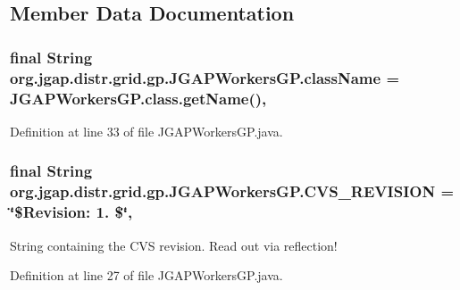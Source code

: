 \subsection{Member Data Documentation}
\hypertarget{classorg_1_1jgap_1_1distr_1_1grid_1_1gp_1_1_j_g_a_p_workers_g_p_a0b24b4c9ff9c7b9b4c87e965b9c81a77}{
\subsubsection[{class\-Name}]{\setlength{\rightskip}{0pt plus 5cm}final String org.\-jgap.\-distr.\-grid.\-gp.\-J\-G\-A\-P\-Workers\-G\-P.\-class\-Name = J\-G\-A\-P\-Workers\-G\-P.\-class.\-get\-Name()\hspace{0.3cm}{\ttfamily [static]}, {\ttfamily [private]}}}\label{classorg_1_1jgap_1_1distr_1_1grid_1_1gp_1_1_j_g_a_p_workers_g_p_a0b24b4c9ff9c7b9b4c87e965b9c81a77}


Definition at line 33 of file J\-G\-A\-P\-Workers\-G\-P.\-java.

\hypertarget{classorg_1_1jgap_1_1distr_1_1grid_1_1gp_1_1_j_g_a_p_workers_g_p_a1c442ed67b0728a29dd84c1205ab2486}{
\subsubsection[{C\-V\-S\-\_\-\-R\-E\-V\-I\-S\-I\-O\-N}]{\setlength{\rightskip}{0pt plus 5cm}final String org.\-jgap.\-distr.\-grid.\-gp.\-J\-G\-A\-P\-Workers\-G\-P.\-C\-V\-S\-\_\-\-R\-E\-V\-I\-S\-I\-O\-N = \char`\"{}\$Revision\-: 1. \$\char`\"{}\hspace{0.3cm}{\ttfamily [static]}, {\ttfamily [private]}}}\label{classorg_1_1jgap_1_1distr_1_1grid_1_1gp_1_1_j_g_a_p_workers_g_p_a1c442ed67b0728a29dd84c1205ab2486}
String containing the C\-V\-S revision. Read out via reflection! 

Definition at line 27 of file J\-G\-A\-P\-Workers\-G\-P.\-java.

